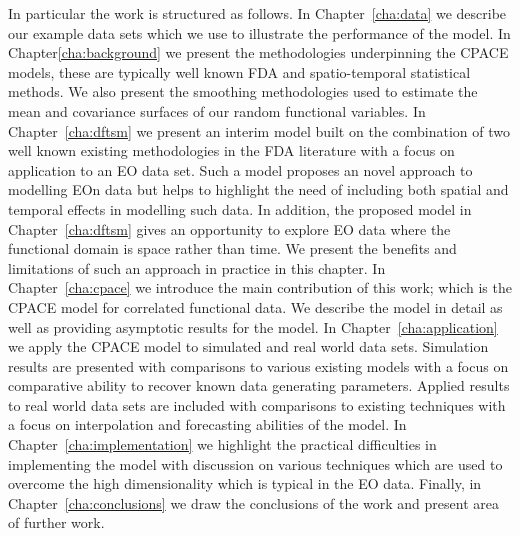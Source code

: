 In particular the work is structured as follows.
In Chapter~\ref{cha:data} we describe our example data sets which we use to illustrate the performance of the model.
In Chapter\ref{cha:background} we present the methodologies underpinning the CPACE models, these are typically well known FDA and spatio-temporal statistical methods.
We also present the smoothing methodologies used to estimate the mean and covariance surfaces of our random functional variables.
In Chapter~\ref{cha:dftsm} we present an interim model built on the combination of two well known existing methodologies in the FDA literature with a focus on application to an EO data set.
Such a model proposes an novel approach to modelling EOn data but helps to highlight the need of including both spatial and temporal effects in modelling such data.
In addition, the proposed model in Chapter~\ref{cha:dftsm} gives an opportunity to explore EO data where the functional domain is space rather than time.
We present the benefits and limitations of such an approach in practice in this chapter.
In Chapter~\ref{cha:cpace} we introduce the main contribution of this work; which is the CPACE model for correlated functional data.
We describe the model in detail as well as providing asymptotic results for the model.
In Chapter~\ref{cha:application} we apply the CPACE model to simulated and real world data sets.
Simulation results are presented with comparisons to various existing models with a focus on comparative ability to recover known data generating parameters.
Applied results to real world data sets are included with comparisons to existing techniques with a focus on interpolation and forecasting abilities of the model.
In Chapter~\ref{cha:implementation} we highlight the practical difficulties in implementing the model with discussion on various techniques which are used to overcome the high dimensionality which is typical in the EO data.
Finally, in Chapter~\ref{cha:conclusions} we draw the conclusions of the work and present area of further work. 